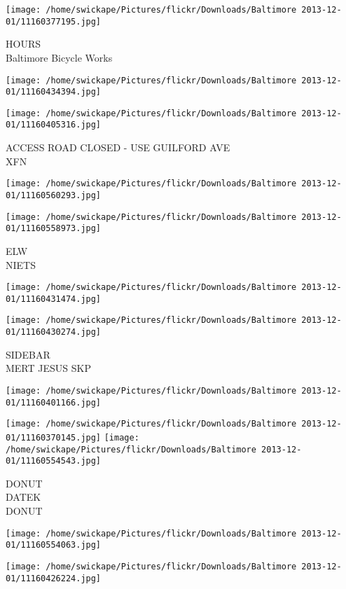 \documentclass[10pt,letterpaper]{article}
\begin{document}
\vspace{0.25in}
\texttt{[image: /home/swickape/Pictures/flickr/Downloads/Baltimore 2013-12-01/11160377195.jpg]}

HOURS\\
Baltimore Bicycle Works
\pagebreak

\texttt{[image: /home/swickape/Pictures/flickr/Downloads/Baltimore 2013-12-01/11160434394.jpg]}

\vspace{0.25in}
\texttt{[image: /home/swickape/Pictures/flickr/Downloads/Baltimore 2013-12-01/11160405316.jpg]}

ACCESS ROAD CLOSED {-} USE GUILFORD AVE\\
XFN
\pagebreak

\texttt{[image: /home/swickape/Pictures/flickr/Downloads/Baltimore 2013-12-01/11160560293.jpg]}

\vspace{0.25in}
\texttt{[image: /home/swickape/Pictures/flickr/Downloads/Baltimore 2013-12-01/11160558973.jpg]}

ELW\\
NIETS
\pagebreak

\texttt{[image: /home/swickape/Pictures/flickr/Downloads/Baltimore 2013-12-01/11160431474.jpg]}

\vspace{0.25in}
\texttt{[image: /home/swickape/Pictures/flickr/Downloads/Baltimore 2013-12-01/11160430274.jpg]}

SIDEBAR\\
MERT JESUS SKP
\pagebreak

\texttt{[image: /home/swickape/Pictures/flickr/Downloads/Baltimore 2013-12-01/11160401166.jpg]}

\vspace{0.25in}
\texttt{[image: /home/swickape/Pictures/flickr/Downloads/Baltimore 2013-12-01/11160370145.jpg]}
\texttt{[image: /home/swickape/Pictures/flickr/Downloads/Baltimore 2013-12-01/11160554543.jpg]}

DONUT\\
DATEK\\
DONUT
\pagebreak

\texttt{[image: /home/swickape/Pictures/flickr/Downloads/Baltimore 2013-12-01/11160554063.jpg]}

\vspace{0.25in}
\texttt{[image: /home/swickape/Pictures/flickr/Downloads/Baltimore 2013-12-01/11160426224.jpg]}
\end{document}
